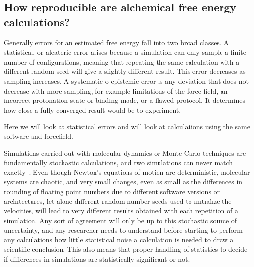 \documentclass[9pt,bestpractices]{livecoms}
\begin{document}
\subsection{How reproducible are alchemical free energy calculations?}
\label{subsec:reproducible}
Generally errors for an estimated free energy fall into two broad classes. A statistical, or aleatoric error arises because a simulation can only sample a finite number of configurations, meaning that repeating the same calculation with
a different random seed will give a slightly different result. This error decreases as sampling increases. A systematic o epistemic error is any deviation that does not decrease with more sampling, for example limitations
of the force field, an incorrect protonation state or binding mode, or a flawed protocol. It determines how close a fully converged result would be to experiment.

Here we will look at statistical errors and will look at calculations using the same software and forcefield.

Simulations carried out with molecular dynamics or Monte Carlo techniques are fundamentally stochastic calculations, and two simulations can never match exactly~\cite{caves1998locally, coveney2016, mdbook2025}.  Even though Newton's equations of motion are deterministic, molecular systems are chaotic, and very small changes, even as small as the  differences in rounding of floating point numbers due to different software versions or architectures, let alone different random number seeds used to initialize the velocities, will lead to very different results obtained with each repetition of a simulation. Any sort of agreement will only be up to this stochastic source of uncertainty, and any researcher needs to understand before starting to perform any calculations how little statistical noise a calculation is needed to draw a scientific conclusion. This also means that proper handling of statistics to decide if differences in simulations are statistically significant or not.  

\end{document}
